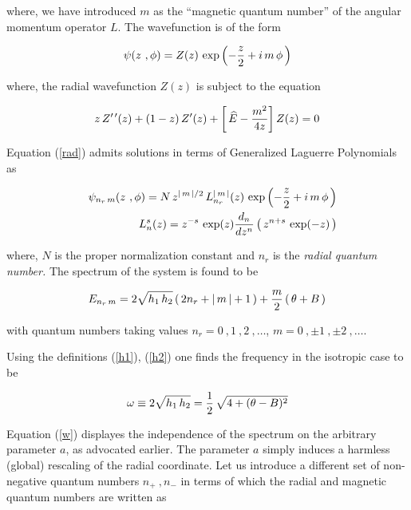 \documentclass[a4paper,aps,prd,preprint]{revtex4}
\begin{document}
 where, we have introduced $m$ as the ``magnetic quantum number'' of the 
 angular momentum operator $L$.  The wavefunction  is of the  form
  
  \begin{equation}
 \psi(z\ ,\phi)= Z(z)\,\exp\left(-{z\over 2}+ i \, m\, \phi\,\right) 
 \end{equation}
 
 where, the radial wavefunction $Z(z)$ is subject to the equation
 
 \begin{equation}
  z\, Z^{\prime\,\prime}(z) + \left(1-z\right) Z^{\prime}(z) 
  +\left[\,\widehat E - {m^2\over 4z}\right] Z(z) =0 \label{rad}
 \end{equation}

  Equation (\ref{rad}) admits solutions in terms of Generalized Laguerre
 Polynomials as 

  \begin{eqnarray}
 && \psi_{n_r\,m}(z\ ,\phi)= N\, 
 z^{ |\,m\,|/2}\, L_{n_r}^{|\,m\,|}(z)\, \exp\left(-{z\over 2}+ i\, m\,\phi\,\right)\\
 && L_{n}^s(z)=z^{-s}\,\exp(z){d_n\over dz^n}\left(\, z^{n+s}\,\exp(-z)\,\right) 
 \end{eqnarray}

  where, $N$ is the proper normalization constant and $n_r$ is the 
  {\it radial quantum number.} The spectrum of the system is found  to be
	
	\begin{equation}
        E_{n_r\, m}= 2\sqrt{h_1\, h_2}\left(\, 2n_r +|\, m\, | + 1\,\right) 
        +{m\over 2} \left(\, \theta +B\,\right) \label{energy}
        \end{equation}

	with quantum numbers taking values $n_r= 0\ , 1\ , 2\ ,\dots$,
	$ m=0\ , \pm 1\ ,\pm 2\ ,\dots $.
   
   Using the definitions  (\ref{h1}), (\ref{h2}) one finds the frequency
   in the isotropic case to be
   
        \begin{equation}
         \omega\equiv  2\sqrt{h_1\, h_2}= {1\over 2}\, \sqrt{4 +(\theta-B)^2}
        \label{w}
        \end{equation}
  
   Equation (\ref{w}) displayes the independence of the spectrum
   on the arbitrary parameter $a$, as advocated earlier.
   The parameter $a$ simply induces a harmless (global) rescaling of the 
   radial coordinate. Let us introduce a different set of non-negative quantum 
   numbers $n_+ \ , n_-$ \cite{messhia} in terms of which the radial and 
   magnetic quantum numbers are written as 
   
\end{document}
